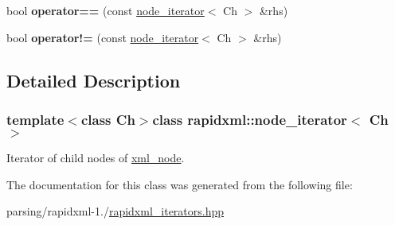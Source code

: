 \begin{DoxyCompactItemize}
\item 
\hypertarget{classrapidxml_1_1node__iterator_a5cb8a3b0d65a1a2517995e986a4debfd}{bool {\bfseries operator==} (const \hyperlink{classrapidxml_1_1node__iterator}{node\-\_\-iterator}$<$ Ch $>$ \&rhs)}\label{classrapidxml_1_1node__iterator_a5cb8a3b0d65a1a2517995e986a4debfd}

\item 
\hypertarget{classrapidxml_1_1node__iterator_a20f1e25347d7e3856694f18597f7c8e2}{bool {\bfseries operator!=} (const \hyperlink{classrapidxml_1_1node__iterator}{node\-\_\-iterator}$<$ Ch $>$ \&rhs)}\label{classrapidxml_1_1node__iterator_a20f1e25347d7e3856694f18597f7c8e2}

\end{DoxyCompactItemize}


\subsection{Detailed Description}
\subsubsection*{template$<$class Ch$>$class rapidxml\-::node\-\_\-iterator$<$ Ch $>$}

Iterator of child nodes of \hyperlink{classrapidxml_1_1xml__node}{xml\-\_\-node}. 

The documentation for this class was generated from the following file\-:\begin{DoxyCompactItemize}
\item 
parsing/rapidxml-\/1./\hyperlink{rapidxml__iterators_8hpp}{rapidxml\-\_\-iterators.\-hpp}\end{DoxyCompactItemize}
